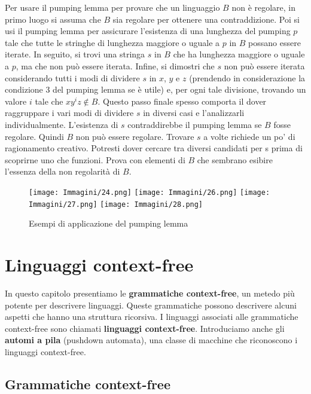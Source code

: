 \documentclass{article}
\begin{document}
Per usare il pumping lemma per provare che un linguaggio $B$ non è regolare, in primo luogo si assuma che $B$ sia regolare per ottenere una contraddizione. Poi si usi il pumping lemma per assicurare l'esistenza di una lunghezza del pumping $p$ tale che tutte le stringhe di lunghezza maggiore o uguale a $p$ in $B$ possano essere iterate. In seguito, si trovi una stringa $s$ in $B$ che ha lunghezza maggiore o uguale a $p$, ma che non può essere iterata. Infine, si dimostri che $s$ non può essere iterata considerando tutti i modi di dividere $s$ in $x$, $y$ e $z$ (prendendo in considerazione la condizione 3 del pumping lemma
se è utile) e, per ogni tale divisione, trovando un valore $i$ tale che $xy^{i}z \notin B$. Questo passo finale spesso comporta il dover raggruppare i vari modi di dividere $s$ in diversi casi e l'analizzarli individualmente. L'esistenza di $s$ contraddirebbe il pumping lemma se $B$ fosse regolare. Quindi $B$ non può essere regolare. Trovare $s$ a volte richiede un po' di ragionamento creativo. Potresti dover cercare tra diversi candidati per s prima di scoprirne uno che funzioni. Prova con elementi di $B$ che sembrano esibire l'essenza della non regolarità di $B$.

\begin{figure}[H]
    \centering
    \texttt{[image: Immagini/24.png]}
    \texttt{[image: Immagini/26.png]}
    \texttt{[image: Immagini/27.png]}
    \texttt{[image: Immagini/28.png]}
    \caption{Esempi di applicazione del pumping lemma}
    \label{fig:your_image}
\end{figure}

\section{Linguaggi context-free}

In questo capitolo presentiamo le \textbf{grammatiche context-free}, un metedo più potente per descrivere linguaggi. Queste grammatiche possono descrivere alcuni aspetti che hanno una struttura ricorsiva.
I linguaggi associati alle grammatiche context-free sono chiamati \textbf{linguaggi context-free}.
Introduciamo anche gli \textbf{automi a pila} (pushdown automata), una classe di macchine che riconoscono i linguaggi context-free.

\subsection{Grammatiche context-free}
\end{document}
